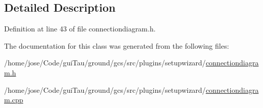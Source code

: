 \subsection{Detailed Description}


Definition at line 43 of file connectiondiagram.\-h.



The documentation for this class was generated from the following files\-:\begin{DoxyCompactItemize}
\item 
/home/jose/\-Code/gui\-Tau/ground/gcs/src/plugins/setupwizard/\hyperlink{connectiondiagram_8h}{connectiondiagram.\-h}\item 
/home/jose/\-Code/gui\-Tau/ground/gcs/src/plugins/setupwizard/\hyperlink{connectiondiagram_8cpp}{connectiondiagram.\-cpp}\end{DoxyCompactItemize}
